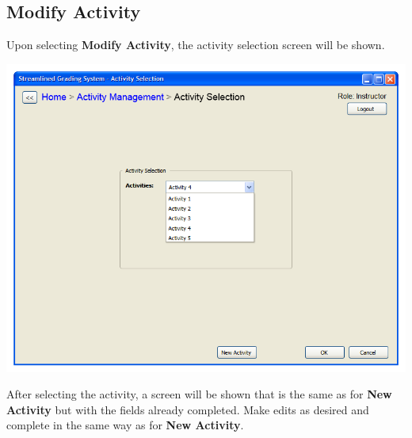 \documentclass{article}
\begin{document}
\subsection{Modify Activity}
Upon selecting \textbf{Modify Activity}, the activity selection screen will be shown.
  \begin{center} 
     \includegraphics[scale=0.55]{../images/UIMockups/pngs/ActivitySelectionAM}
  \end{center} 
After selecting the activity, a screen will be shown that is the same as for 
\textbf{New Activity} but with the fields already completed. Make edits as desired and 
complete in the same way as for \textbf{New Activity}.
\end{document}

